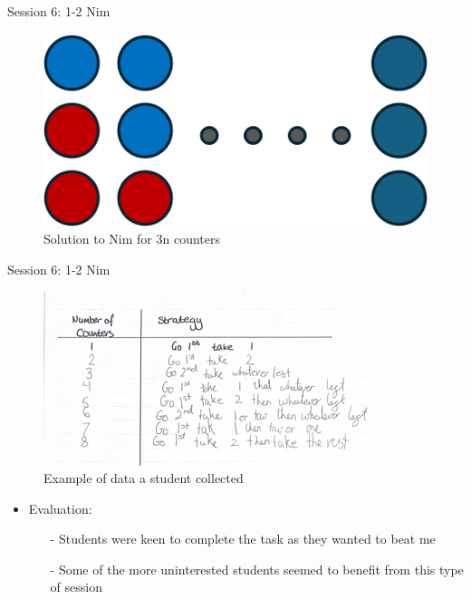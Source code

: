 \documentclass{beamer}  %
\begin{document}
\begin{frame}{Session 6: 1-2 Nim}
    \begin{figure}
        \includegraphics[scale = 1]{Images/Nim_solution.png}
        \caption{Solution to Nim for 3n counters}
    \end{figure}
\end{frame}

\begin{frame}{Session 6: 1-2 Nim}
    \begin{figure}
        \includegraphics[scale = 0.6]{Images/1-2Nim.png}
        \caption{Example of data a student collected}
    \end{figure} 
            \begin{itemize}
                \item Evaluation:
                \begin{itemize}
                    \item[-] Students were keen to complete the task as they wanted to beat me
                    \item[-] Some of the more uninterested students seemed to benefit from this type of session
                \end{itemize}
            \end{itemize}

\end{frame}
\end{document}
